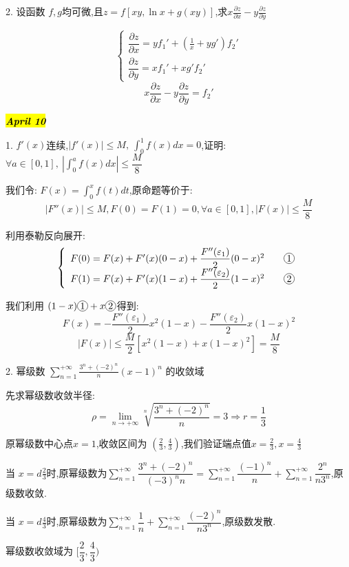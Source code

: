 2. 设函数 $f,g$均可微,且$z=f[xy,\ln x+g(xy)]$,求$x\frac{\partial z}{\partial x}-y\frac{\partial z}{\partial y}$
\begin{solution}
	$$\left\lbrace 
	\begin{array}{l}
		\dfrac{\partial z}{\partial x}=yf_{1}'+(\frac{1}{x}+yg')f_{2}'\\
		\dfrac{\partial z}{\partial y}=xf_{1}'+xg'f_{2}'
	\end{array}\right. $$
	$$x\frac{\partial z}{\partial x}-y\frac{\partial z}{\partial y}=f_{2}'$$
\end{solution}

\hl{\textbf{\textit{April 10}}}

1. $f'(x)$连续,\quad$|f'(x)|\leq M,\ \int_{0}^{1}f(x)dx=0$,证明: $\forall a\in [0,1],\ |\int_{0}^{a}f(x)dx|\leq \dfrac{M}{8}$
\begin{solution}
	
	我们令: $F(x)=\int_{0}^{x}f(t)dt$,原命题等价于: 
	$$|F''(x)|\leq M, F(0)=F(1)=0, \forall a\in [0,1],|F(x)|\leq \frac{M}{8}$$
	
	利用泰勒反向展开: 
	$$\left\lbrace 
	\begin{array}{l}
		F(0)=F(x)+F'(x)(0-x)+\dfrac{F''(\varepsilon_{1})}{2}(0-x)^2 \qquad \circled{1} \\
		F(1)=F(x)+F'(x)(1-x)+\dfrac{F''(\varepsilon_{2})}{2}(1-x)^2 \qquad \circled{2}
	\end{array}\right. $$
	
	我们利用 $(1-x) \circled{1}+x \circled{2}$得到: 
	$$F(x)=-\frac{F''(\varepsilon_{1})}{2}x^2(1-x)-\frac{F''(\varepsilon_{2})}{2}x(1-x)^2$$
	$$|F(x)|\leq \frac{M}{2}[x^2(1-x)+x(1-x)^2]=\frac{M}{8}$$
\end{solution}

2. 幂级数 $\sum\limits_{n=1}^{+\infty}\frac{3^n+(-2)^n}{n}(x-1)^n$ 的收敛域
\begin{solution}
	
	先求幂级数收敛半径: 
	$$\rho=\lim\limits_{n\rightarrow +\infty}\sqrt[n]{\frac{3^n+(-2)^n}{n}}=3\Rightarrow r=\frac{1}{3}$$
	
	原幂级数中心点$x=1$,收敛区间为 $(\frac{2}{3},\frac{4}{3})$,我们验证端点值$x=\frac{2}{3},x=\frac{4}{3}$
	
	当 $x=d\frac{2}{3}$时,原幂级数为$\sum\limits_{n=1}^{+\infty}\dfrac{3^n+(-2)^{n}}{(-3)^{n}n}=\sum\limits_{n=1}^{+\infty}\dfrac{(-1)^n}{n}+\sum\limits_{n=1}^{+\infty}\dfrac{2^n}{n3^n}$,原级数收敛.
	
	当 $x=d\frac{4}{3}$时,原幂级数为$\sum\limits_{n=1}^{+\infty}\dfrac{1}{n}+\sum\limits_{n=1}^{+\infty}\dfrac{(-2)^n}{n3^n}$,原级数发散.
	
	幂级数收敛域为 $[\dfrac{2}{3},\dfrac{4}{3})$
\end{solution}

